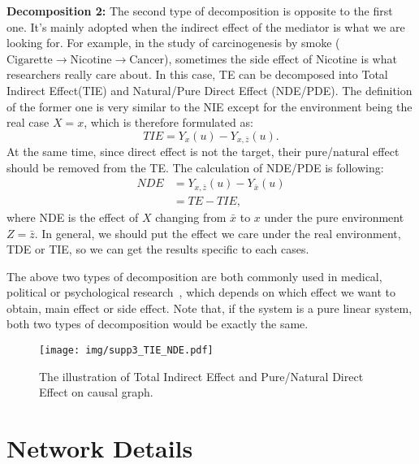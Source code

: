 \documentclass[10pt,twocolumn,letterpaper]{article}
\begin{document}
\noindent\textbf{Decomposition 2:} The second type of decomposition is opposite to the first one. It's mainly adopted when the indirect effect of the mediator is what we are looking for. For example, in the study of carcinogenesis by smoke ($\text{Cigarette}\to \text{Nicotine}\to \text{Cancer}$), sometimes the side effect of Nicotine is what researchers really care about. In this case, TE can be decomposed into Total Indirect Effect(TIE) and Natural/Pure Direct Effect (NDE/PDE). The definition of the former one is very similar to the NIE except for the environment being the real case $X=x$, which is therefore formulated as:
\begin{equation}
    TIE = Y_x(u)-Y_{x, \bar{z}}(u).
\end{equation}
At the same time, since direct effect is not the target, their pure/natural effect should be removed from the TE. The calculation of NDE/PDE is following:
\begin{align}
    NDE &= Y_{x, \bar{z}}(u) - Y_{\bar{x}}(u) \\
        &= TE - TIE,
\end{align}
where NDE is the effect of $X$ changing from $\bar{x}$ to $x$ under the pure environment $Z=\bar{z}$. In general, we should put the effect we care under the real environment, \ie TDE or TIE, so we can get the results specific to each cases. 

The above two types of decomposition are both commonly used in medical, political or psychological research~\cite{richiardi2013mediation, keele2015statistics, dunn2015evaluation, mackinnon2007mediation, king2008political}, which depends on which effect we want to obtain, main effect or side effect. Note that, if the system is a pure linear system, both two types of decomposition would be exactly the same. 

\begin{figure}[t!]
   \begin{minipage}[b]{1\linewidth}
   \centerline{\texttt{[image: img/supp3\_TIE\_NDE.pdf]}}
   \end{minipage}
   \caption{The illustration of Total Indirect Effect and Pure/Natural Direct Effect on causal graph.}
   \label{supp_fig:tie_nde} \end{figure}

\section{Network Details}
\label{sec:networks}
\end{document}
